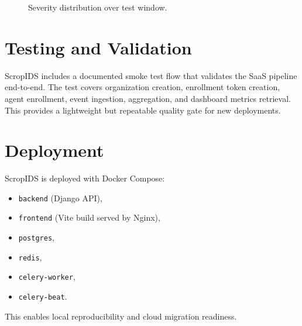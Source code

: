\documentclass[conference]{IEEEtran}
\begin{document}
\begin{figure}[!t]
\centering
{}
\caption{Severity distribution over test window.}
\label{fig:severity}
\end{figure}
\FloatBarrier

\section{Testing and Validation}
ScropIDS includes a documented smoke test flow that validates the SaaS pipeline end-to-end. The test covers organization creation, enrollment token creation, agent enrollment, event ingestion, aggregation, and dashboard metrics retrieval. This provides a lightweight but repeatable quality gate for new deployments.

\section{Deployment}
ScropIDS is deployed with Docker Compose:
\begin{itemize}[leftmargin=1.2em]
    \item \texttt{backend} (Django API),
    \item \texttt{frontend} (Vite build served by Nginx),
    \item \texttt{postgres},
    \item \texttt{redis},
    \item \texttt{celery-worker},
    \item \texttt{celery-beat}.
\end{itemize}
This enables local reproducibility and cloud migration readiness.
\end{document}
